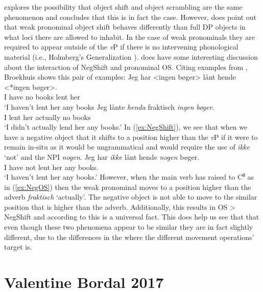 \documentclass[12pt, letterpaper]{article}
\begin{document}
\ea \cite{broekhuisUnificationObjectShift2020} explores the possibility that object shift and object scrambling are the same phenomenon and concludes that this is in fact the case.
\ex However, \citeauthor[417f]{broekhuisUnificationObjectShift2020} does point out that weak pronominal object shift behaves differently than full DP objects in what loci there are allowed to inhabit. In the case of weak pronominals they are required to appear outside of the \textit{v}P if there is no intervening phonological material (i.e., Holmberg's Generalization \cite{holmbergWordOrderSyntactic1986,holmbergRemarksHolmbergGeneralization1999}).
\ex \citeauthor{broekhuisUnificationObjectShift2020} does have some interesting discussion about the interaction of NegShift and pronominal OS. 
\ex Citing examples from \citet[163ff]{christensenInterfacesNegationSyntax2005}, Broekhuis shows this pair of examples:
	\ea \label{ex:NegShift}
	\gll Jeg har <ingen bøger> lånt hende <*ingen bøger>.\\
	I have no books lent her\\
	\glt `I haven't lent her any books
	\ex \label{ex:NegOS}
	\gll Jeg lånte \textit{henda} fraktisch \textit{ingen} \textit{bøger}.\\
	I lent her actually no books\\
	\glt `I didn't actually lend her any books.'
	\z
\ex In (\ref{ex:NegShift}), we see that when we have a negative object that it shifts to a position higher than the \textit{v}P if it were to remain in-situ as it would be ungrammatical and would require the use of \textit{ikke} `not' and the NPI \textit{nogen}.
	\ea
	\gll Jeg har \textit{ikke} lånt hende \textit{nogen} bøger.\\
	I have not lent her any books.\\
	\glt `I haven't lent her any books.'
	\z
\ex However, when the main verb has raised to C⁰ as in (\ref{ex:NegOS}) then the weak pronominal moves to a position higher than the adverb \textit{fraktisch} `actually'. The negative object is not able to move to the similar position that is higher than the adverb. Additionally, this results in OS > NegShift and according to \citeauthor{broekhuisUnificationObjectShift2020} this is a universal fact.
\ex This does help us see that that even though these two phenomena appear to be similar they are in fact slightly different, due to the differences in the where the different movement operations' target is.
\z 


\section{Valentine Bordal 2017} \label{sec:VB}
\end{document}
